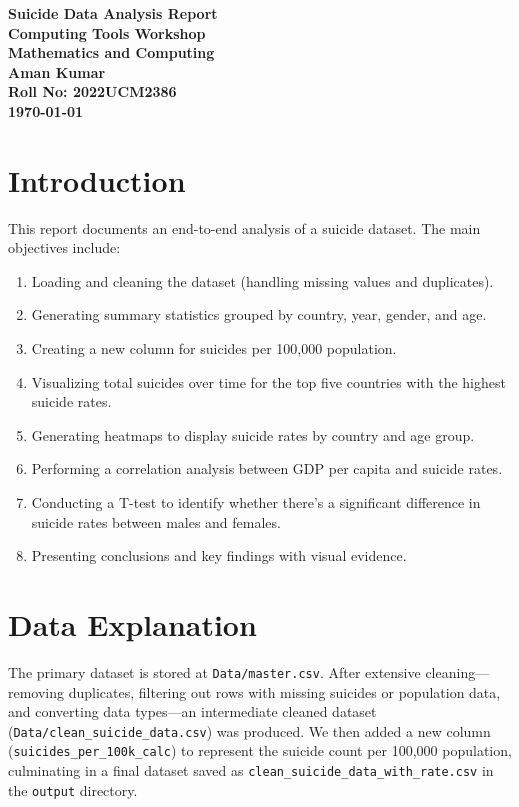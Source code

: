 \documentclass[12pt,a4paper]{article}
\begin{document}
\begin{titlepage}
  \centering
  \vspace*{3cm}
  {\Huge \textbf{Suicide Data Analysis Report}}\\[2em]
  {\large \textbf{Computing Tools Workshop}}\\[0.5em]
  {\large \textbf{Mathematics and Computing}}\\[3em]
  {\large \textbf{Aman Kumar}}\\[0.3em]
  {\large \textbf{Roll No: 2022UCM2386}}\\
  \vfill
  \textbf{\today}
  \vspace*{2cm}
\end{titlepage}

\tableofcontents
\clearpage

\section{Introduction}
This report documents an end-to-end analysis of a suicide dataset. The main objectives include:
\begin{enumerate}
  \item Loading and cleaning the dataset (handling missing values and duplicates).
  \item Generating summary statistics grouped by country, year, gender, and age.
  \item Creating a new column for suicides per 100,000 population.
  \item Visualizing total suicides over time for the top five countries with the highest suicide rates.
  \item Generating heatmaps to display suicide rates by country and age group.
  \item Performing a correlation analysis between GDP per capita and suicide rates.
  \item Conducting a T-test to identify whether there's a significant difference in suicide rates between males and females.
  \item Presenting conclusions and key findings with visual evidence.
\end{enumerate}

\section{Data Explanation}
The primary dataset is stored at \texttt{Data/master.csv}. After extensive cleaning—removing duplicates, filtering out rows with missing suicides or population data, and converting data types—an intermediate cleaned dataset (\texttt{Data/clean\_suicide\_data.csv}) was produced. We then added a new column (\texttt{suicides\_per\_100k\_calc}) to represent the suicide count per 100,000 population, culminating in a final dataset saved as \texttt{clean\_suicide\_data\_with\_rate.csv} in the \texttt{output} directory.
\end{document}
